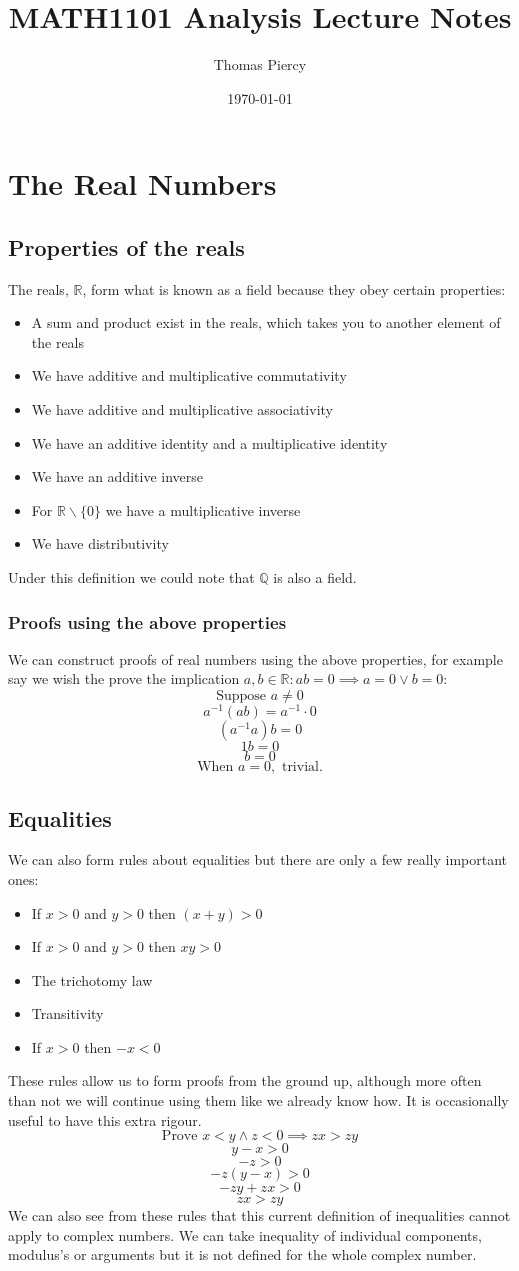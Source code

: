 \documentclass[12pt]{article}
\title{\textbf{MATH1101 Analysis Lecture Notes}}
\author{Thomas Piercy}
\date{\today{}}
\begin{document}
\maketitle
\hrulefill
\tableofcontents
\newpage
{}
\section{The Real Numbers}
\subsection*{Properties of the reals}
The reals, \(\mathbb{R}\), form what is known as a field because they obey certain properties:
\begin{itemize}
    \item A sum and product exist in the reals, which takes you to another element of the reals
    \item We have additive and multiplicative commutativity
    \item We have additive and multiplicative associativity
    \item We have an additive identity and a multiplicative identity
    \item We have an additive inverse
    \item For \(\mathbb{R}\backslash\{0\}\) we have a multiplicative inverse
    \item We have distributivity
\end{itemize}
Under this definition we could note that \(\mathbb{Q}\) is also a field.
\subsubsection*{Proofs using the above properties}
We can construct proofs of real numbers using the above properties, for example say we wish the prove the implication \(a,b\in\mathbb{R}:ab=0\implies a=0\lor b=0\):
\[\text{Suppose } a\ne0\]
\[a^{-1}(ab)=a^{-1}\cdot0\]
\[(a^{-1}a)b=0\]
\[1b=0\]
\[b=0\]
\[\text{When } a=0, \text{ trivial.}\]
\subsection*{Equalities}
We can also form rules about equalities but there are only a few really important ones:
\begin{itemize}
    \item If \(x>0\) and \(y>0\) then \((x+y)>0\)
    \item If \(x>0\) and \(y>0\) then \(xy>0\)
    \item The trichotomy law
    \item Transitivity
    \item If \(x>0\) then \(-x<0\)
\end{itemize}
These rules allow us to form proofs from the ground up, although more often than not we will continue using them like we already know how. It is occasionally useful to have this extra rigour.
\[\text{Prove }x<y\land z<0 \implies zx>zy\]
\[y-x>0\]
\[-z>0\]
\[-z(y-x)>0\]
\[-zy+zx>0\]
\[zx>zy\]
We can also see from these rules that this current definition of inequalities cannot apply to complex numbers. We can take inequality of individual components, modulus's or arguments but it is not defined for the whole complex number.
\end{document}
